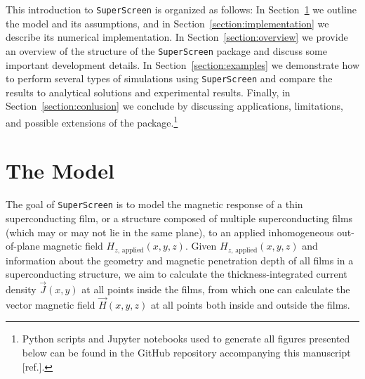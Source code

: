 \documentclass[final,3p,times,twocolumn]{elsarticle}
\newcommand{\inline}[1]{\texttt{#1}\xspace}
\newcommand{\SuperScreen}{\inline{SuperScreen}}
\begin{document}
This introduction to \SuperScreen is organized as follows: In Section~\ref{section:model} we outline the model and its assumptions, and in Section~\ref{section:implementation} we describe its numerical implementation. In Section~\ref{section:overview} we provide an overview of the structure of the \SuperScreen package and discuss some important development details. In Section~\ref{section:examples} we demonstrate how to perform several types of simulations using \SuperScreen and compare the results to analytical solutions and experimental results. Finally, in Section~\ref{section:conlusion} we conclude by discussing applications, limitations, and possible extensions of the package.\footnote{Python scripts and Jupyter notebooks used to generate all figures presented below can be found in the GitHub repository accompanying this manuscript [ref.].}

\section{The Model}
\label{section:model}

The goal of \SuperScreen is to model the magnetic response of a thin superconducting film, or a structure composed of multiple superconducting films (which may or may not lie in the same plane), to an applied inhomogeneous out-of-plane magnetic field
$H_{z,\,\mathrm{applied}}(x, y, z)$. Given $H_{z,\,\mathrm{applied}}(x, y, z)$ and information about the geometry and magnetic penetration depth of all films in a superconducting structure, we aim to calculate the thickness-integrated current density $\vec{J}(x, y)$ at all points inside the films, from which one can calculate the vector magnetic field $\vec{H}(x, y, z)$ at all points both inside and outside the films.
\end{document}
